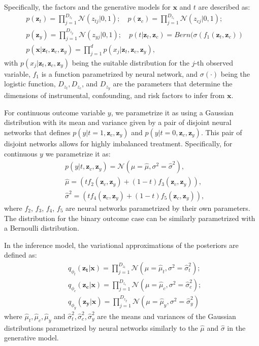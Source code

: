 \documentclass[letterpaper]{article} %
\begin{document}
Specifically, the factors and the generative models for $\mathbf{x}$ and $t$ are described as:
\begin{align}
&p(\mathbf{z}_t) = \prod\limits_{j=1}^{D_{z_t}} \mathcal{N}(z_{tj}|0,1);\quad
p(\mathbf{z}_c) = \prod\limits_{j=1}^{D_{z_c}} \mathcal{N}(z_{cj}|0,1); \nonumber\\
&p(\mathbf{z}_y) = \prod\limits_{j=1}^{D_{z_y}} \mathcal{N}(z_{yj}|0,1);\quad p(t|\mathbf{z}_t,\mathbf{z}_c) = Bern(\sigma(f_1(\mathbf{z}_t,\mathbf{z}_c))\nonumber\\
& p(\mathbf{x}|\mathbf{z}_t,\mathbf{z}_c, \mathbf{z}_y) = \prod\limits_{j=1}^{d} p(x_j|\mathbf{z}_t,\mathbf{z}_c, \mathbf{z}_y),
\end{align}
with $p(x_j|\mathbf{z}_t,\mathbf{z}_c, \mathbf{z}_y)$ being the suitable distribution for the $j$-th observed variable, $f_1$ is a function parametrized by neural network, and $\sigma(\cdot)$ being the logistic function, $D_{z_t},D_{z_c}$, and $D_{z_y}$ are the parameters that determine the dimensions of instrumental, confounding, and risk factors to infer from $\mathbf{x}$.

For continuous outcome variable $y$, we parametrize it as using a Gaussian distribution with its mean and variance given by a pair of disjoint neural networks that defines $p(y|t=1,\mathbf{z}_c, \mathbf{z}_y)$ and $p(y|t=0,\mathbf{z}_c, \mathbf{z}_y)$. This pair of disjoint networks allows for highly imbalanced treatment. Specifically, for continuous $y$ we parametrize it as:
\begin{align}
&p(y|t, \mathbf{z}_c, \mathbf{z}_y)  = \mathcal{N}(\mu =\hat{\mu}, \sigma^2 = \hat{\sigma}^2),\nonumber\\
&\hat{\mu} = (tf_2(\mathbf{z}_c, \mathbf{z}_y) + (1-t)f_3(\mathbf{z}_c, \mathbf{z}_y)), \nonumber\\
&\hat{\sigma}^2 = (tf_4(\mathbf{z}_c, \mathbf{z}_y) + (1-t)f_5(\mathbf{z}_c, \mathbf{z}_y)),
\end{align}
where $f_2$, $f_3$, $f_4$, $f_5$ are neural networks parametrized by their own parameters.
The distribution for the binary outcome case can be similarly parametrized with a Bernoulli distribution.

In the inference model, the variational approximations of the posteriors are defined as:
\begin{align}
&q_{\phi_{t}}(\mathbf{z_t}|\mathbf{x}) = \prod\limits_{j=1}^{D_{z_t}} \mathcal{N}(\mu = \hat{\mu}_{t}, \sigma^2 = \hat{\sigma}_t^2 );\nonumber\\
&q_{\phi_{c}}(\mathbf{z_c}|\mathbf{x}) = \prod\limits_{j=1}^{D_{z_c}} \mathcal{N} (\mu = \hat{\mu}_{c}, \sigma^2 = \hat{\sigma}_c^2 );\nonumber\\
&q_{\phi_{y}}(\mathbf{z_y}|\mathbf{x}) = \prod\limits_{j=1}^{D_{z_y}} \mathcal{N} (\mu = \hat{\mu}_{y}, \sigma^2 = \hat{\sigma}_y^2 )
\end{align}
where $\hat{\mu}_t, \hat{\mu}_c, \hat{\mu}_y$ and $ \hat{\sigma}_t^2,  \hat{\sigma}_c^2,  \hat{\sigma}_y^2$ are the means and variances of the Gaussian distributions parametrized by neural networks similarly to the $\hat{\mu}$ and $\hat{\sigma}$ in the generative model.
\end{document}
